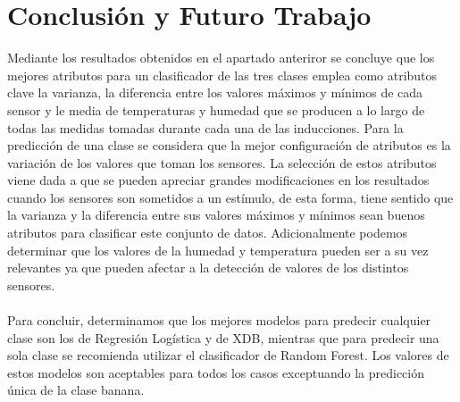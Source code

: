 \documentclass{esannV2}
\begin{document}
\section{Conclusión y Futuro Trabajo}
Mediante los resultados obtenidos en el apartado anteriror se concluye que los mejores atributos para un clasificador de las tres clases emplea como atributos clave la varianza, la diferencia entre los valores máximos y mínimos de cada sensor y le media de temperaturas y humedad que se producen a lo largo de todas las medidas tomadas durante cada una de las inducciones.  Para la predicción de una clase se considera que la mejor configuración de atributos es la variación de los valores que toman los sensores. La selección de estos atributos viene dada a que se pueden apreciar grandes modificaciones en los resultados cuando los sensores son sometidos a un estímulo, de esta forma, tiene sentido que la varianza y la diferencia entre sus valores máximos y mínimos sean buenos atributos para clasificar este conjunto de datos. Adicionalmente podemos determinar que los valores de la humedad y temperatura pueden ser a su vez relevantes ya que pueden afectar a la detección de valores de los distintos sensores. \\ \\
Para concluir, determinamos que los mejores modelos para predecir cualquier clase son los de Regresión  Logística y de XDB, mientras que para predecir una sola clase se recomienda utilizar el clasificador de Random Forest. Los valores de estos modelos son aceptables para todos los casos exceptuando la predicción única de la clase banana.\\

\end{document}
